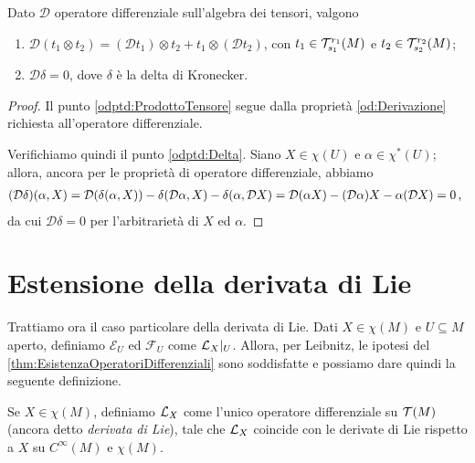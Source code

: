 \begin{corollary} \label{cor:OperatoreDifferenzialeProdottoTensoreEDelta}
	Dato $\mathcal D$ operatore differenziale sull'algebra dei tensori, valgono
	\begin{enumerate}
		\item $\mathcal D(t_1\otimes t_2) = (\mathcal D t_1) \otimes t_2 + t_1\otimes (\mathcal D t_2)$, con $t_1 \in \mathcal T^{r_1}_{s_1}(M)$ e $t_2 \in \mathcal T^{r_2}_{s_2}(M)$; \label{odptd:ProdottoTensore}
		\item $\mathcal D\delta = 0$, dove $\delta$ è la delta di Kronecker. \label{odptd:Delta}
	\end{enumerate}
\end{corollary}
\begin{proof}
	Il punto \ref{odptd:ProdottoTensore} segue dalla proprietà \ref{od:Derivazione} richiesta all'operatore differenziale. 
	
	Verifichiamo quindi il punto \ref{odptd:Delta}.	
	Siano $X\in\chi(U)$ e $\alpha\in\chi^*(U)$; allora, ancora per le proprietà di operatore differenziale, abbiamo
	\begin{align*}
	(\mathcal D\delta)(\alpha, X) = \mathcal D(\delta(\alpha,X)) - \delta(\mathcal D\alpha,X) - \delta(\alpha,\mathcal D X) = \mathcal D (\alpha X) - (\mathcal D\alpha)X - \alpha(\mathcal DX) = 0\, \text{, }
	\end{align*}
	da cui $\mathcal D\delta = 0$ per l'arbitrarietà di $X$ ed $\alpha$.
\end{proof}

\section{Estensione della derivata di Lie} %

Trattiamo ora il caso particolare della derivata di Lie.
Dati $X\in\chi(M)$ e $U\subseteq M$ aperto, definiamo $\mathcal E_U$ ed $\mathcal F_U$ come $\mathcal L_X|_ U$.
Allora, per Leibnitz, le ipotesi del \cref{thm:EsistenzaOperatoriDifferenziali} sono soddisfatte e possiamo dare quindi la seguente definizione.

\begin{definition} 
	Se $X\in\chi(M)$, definiamo $\mathcal L_X$ come l'unico operatore differenziale su $\mathcal T(M)$ (ancora detto \emph{derivata di Lie}), tale che $\mathcal L_X$ coincide con le derivate di Lie rispetto a $X$ su $C^\infty(M)$ e $\chi(M)$.
\end{definition}

